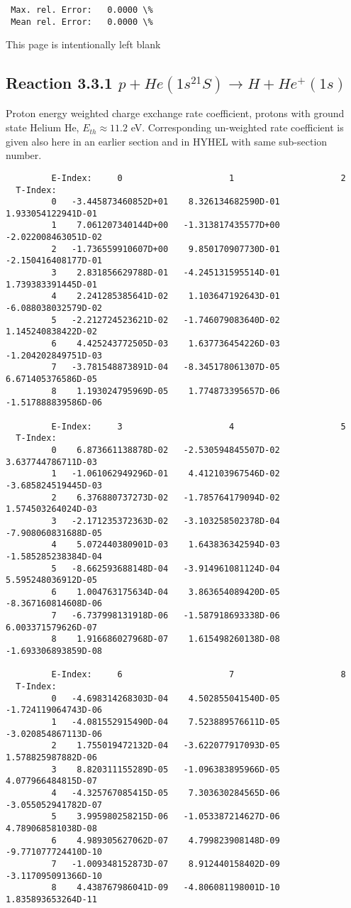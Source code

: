 \documentclass[12pt,dvipdfmx]{article}
\begin{document}
{\begin{small}
\begin{verbatim}
 Max. rel. Error:   0.0000 \%
 Mean rel. Error:   0.0000 \%
\end{verbatim}\end{small}

\newpage
This page is intentionally left blank
\newpage
\subsection{
Reaction 3.3.1  $  p + He(1s^21S) \rightarrow  H + He^+(1s) $
}
Proton energy weighted charge exchange rate coefficient,
protons with ground state Helium He, $E_{th} \approx 11.2$ eV.
Corresponding un-weighted rate coefficient is given also here in an earlier section and in HYHEL with same sub-section number.


\begin{small}\begin{verbatim}
         E-Index:     0                     1                     2
  T-Index:
         0   -3.445873460852D+01    8.326134682590D-01    1.933054122941D-01
         1    7.061207340144D+00   -1.313817435577D+00   -2.022008463051D-02
         2   -1.736559910607D+00    9.850170907730D-01   -2.150416408177D-01
         3    2.831856629788D-01   -4.245131595514D-01    1.739383391445D-01
         4    2.241285385641D-02    1.103647192643D-01   -6.088038032579D-02
         5   -2.212724523621D-02   -1.746079083640D-02    1.145240838422D-02
         6    4.425243772505D-03    1.637736454226D-03   -1.204202849751D-03
         7   -3.781548873891D-04   -8.345178061307D-05    6.671405376586D-05
         8    1.193024795969D-05    1.774873395657D-06   -1.517888839586D-06

         E-Index:     3                     4                     5
  T-Index:
         0    6.873661138878D-02   -2.530594845507D-02    3.637744786711D-03
         1   -1.061062949296D-01    4.412103967546D-02   -3.685824519445D-03
         2    6.376880737273D-02   -1.785764179094D-02    1.574503264024D-03
         3   -2.171235372363D-02   -3.103258502378D-04   -7.908060831688D-05
         4    5.072440380901D-03    1.643836342594D-03   -1.585285238384D-04
         5   -8.662593688148D-04   -3.914961081124D-04    5.595248036912D-05
         6    1.004763175634D-04    3.863654089420D-05   -8.367160814608D-06
         7   -6.737998131918D-06   -1.587918693338D-06    6.003371579626D-07
         8    1.916686027968D-07    1.615498260138D-08   -1.693306893859D-08

         E-Index:     6                     7                     8
  T-Index:
         0   -4.698314268303D-04    4.502855041540D-05   -1.724119064743D-06
         1   -4.081552915490D-04    7.523889576611D-05   -3.020854867113D-06
         2    1.755019472132D-04   -3.622077917093D-05    1.578825987882D-06
         3    8.820311155289D-05   -1.096383895966D-05    4.077966484815D-07
         4   -4.325767085415D-05    7.303630284565D-06   -3.055052941782D-07
         5    3.995980258215D-06   -1.053387214627D-06    4.789068581038D-08
         6    4.989305627062D-07    4.799823908148D-09   -9.771077724410D-10
         7   -1.009348152873D-07    8.912440158402D-09   -3.117095091366D-10
         8    4.438767986041D-09   -4.806081198001D-10    1.835893653264D-11


\end{verbatim}
\end{small}}
\end{document}
